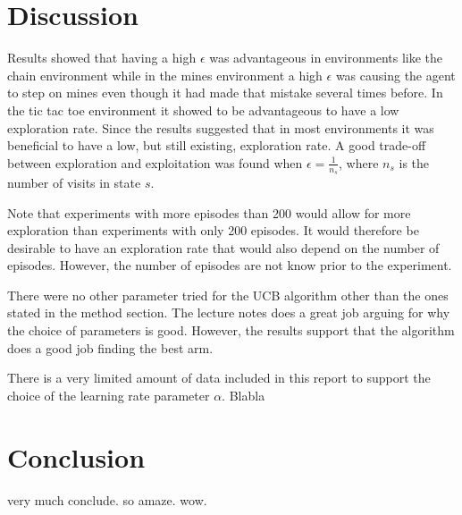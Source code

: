 \documentclass[11pt]{article}
\numberwithin{equation}{section}
\begin{document}
\begin{flushleft}
\section{Discussion}

Results showed that having a high $\epsilon$ was advantageous in environments like the chain environment while in the mines environment a high $\epsilon$ was causing the agent to step on mines even though it had made that mistake several times before. In the tic tac toe environment it showed to be advantageous to have a low exploration rate. Since the results suggested that in most environments it was beneficial to have a low, but still existing, exploration rate. A good trade-off between exploration and exploitation was found when $\epsilon = \frac{1}{n_s}$, where $n_s$ is the number of visits in state $s$. \newline 

Note that experiments with more episodes than 200 would allow for more exploration than experiments with only 200 episodes. It would therefore be desirable to have an exploration rate that would also depend on the number of episodes. However, the number of episodes are not know prior to the experiment. \newline

There were no other parameter tried for the UCB algorithm other than the ones stated in the method section. The lecture notes does a great job arguing for why the choice of parameters is good. However, the results support that the algorithm does a good job finding the best arm. \newline

There is a very limited amount of data included in this report to support the choice of the learning rate parameter $\alpha$. Blabla

\section{Conclusion}

very much conclude. so amaze. wow.

\end{flushleft}
\end{document}
